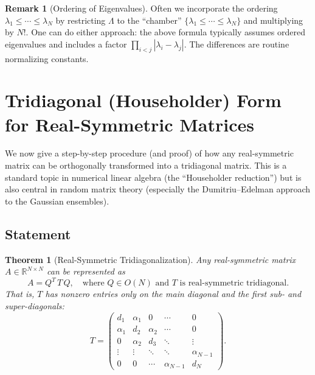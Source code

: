 \documentclass[letterpaper,11pt,oneside,reqno]{article}
\numberwithin{equation}{section}
\newtheorem{theorem}[proposition]{Theorem}
\theoremstyle{definition}
\newtheorem{remark}[proposition]{Remark}
\begin{document}
\begin{remark}[Ordering of Eigenvalues]
Often we incorporate the ordering \(\lambda_1\le\cdots\le \lambda_N\) by restricting \(\Lambda\) to the “chamber” \(\{\lambda_1\le\cdots\le\lambda_N\}\) and multiplying by \(N!\).  One can do either approach: the above formula typically assumes ordered eigenvalues and includes a factor \(\prod_{i<j}|\lambda_i-\lambda_j|\).  The differences are routine normalizing constants.
\end{remark}

\section{Tridiagonal (Householder) Form for Real-Symmetric Matrices}
\label{sec:householder}

We now give a step-by-step procedure (and proof) of how any real-symmetric matrix can be orthogonally transformed into a tridiagonal matrix. This is a standard topic in numerical linear algebra (the “Householder reduction”) but is also central in random matrix theory (especially the Dumitriu–Edelman approach to the Gaussian ensembles).

\subsection{Statement}

\begin{theorem}[Real-Symmetric Tridiagonalization]
\label{thm:tridiagonal}
Any real-symmetric matrix \(A\in\mathbb{R}^{N\times N}\) can be represented as
\[
  A = Q^T\, T\, Q,
  \quad
  \text{where } Q\in O(N)
  \text{ and } T\text{ is real-symmetric tridiagonal.}
\]
That is, \(T\) has nonzero entries only on the main diagonal and the first sub- and super-diagonals:
\[
  T = \begin{pmatrix}
         d_1 & \alpha_1 & 0 & \cdots & 0\\
         \alpha_1 & d_2 & \alpha_2 & \cdots & 0\\
         0 & \alpha_2 & d_3 & \ddots & \vdots\\
         \vdots & \vdots & \ddots & \ddots & \alpha_{N-1}\\
         0 & 0 & \cdots & \alpha_{N-1} & d_N
       \end{pmatrix}.
\]
\end{theorem}
\end{document}
